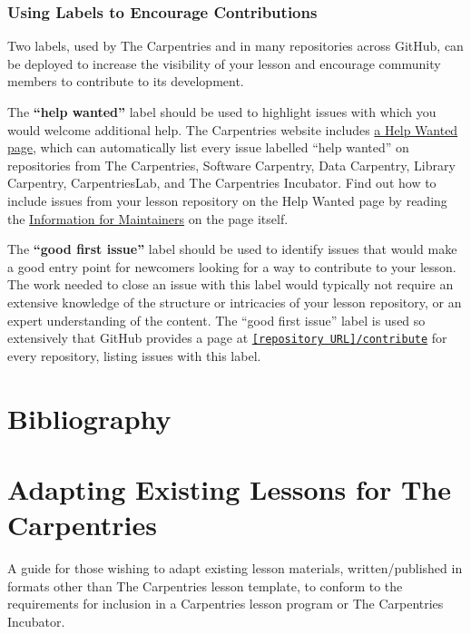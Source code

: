 \documentclass[
]{book}
\begin{document}
\hypertarget{using-labels-to-encourage-contributions}{%
\subsection{Using Labels to Encourage Contributions}\label{using-labels-to-encourage-contributions}}

Two labels, used by The Carpentries and in many repositories across GitHub, can be deployed to increase the visibility of your lesson and encourage community members to contribute to its development.

The \textbf{``help wanted''} label should be used to highlight issues with which you would welcome additional help. The Carpentries website includes \href{https://carpentries.org/help-wanted-issues/}{a Help Wanted page}, which can automatically list every issue labelled ``help wanted'' on repositories from The Carpentries, Software Carpentry, Data Carpentry, Library Carpentry, CarpentriesLab, and The Carpentries Incubator.
Find out how to include issues from your lesson repository on the Help Wanted page by reading the \href{https://carpentries.org/help-wanted-issues/\#for-maintainers}{Information for Maintainers} on the page itself.

The \textbf{``good first issue''} label should be used to identify issues that would make a good entry point for newcomers looking for a way to contribute to your lesson. The work needed to close an issue with this label would typically not require an extensive knowledge of the structure or intricacies of your lesson repository, or an expert understanding of the content. The ``good first issue'' label is used so extensively that GitHub provides a page at \href{https://github.com/swcarpentry/r-novice-gapminder/contribute}{\texttt{{[}repository\ URL{]}/contribute}} for every repository, listing issues with this label.

\hypertarget{bibliography}{%
\chapter{Bibliography}\label{bibliography}}

\hypertarget{adapting-existing-lessons-for-the-carpentries}{%
\chapter{Adapting Existing Lessons for The Carpentries}\label{adapting-existing-lessons-for-the-carpentries}}

A guide for those wishing to adapt existing lesson materials,
written/published in formats other than The Carpentries lesson template,
to conform to the requirements for inclusion in a Carpentries lesson program
or The Carpentries Incubator.
\end{document}
